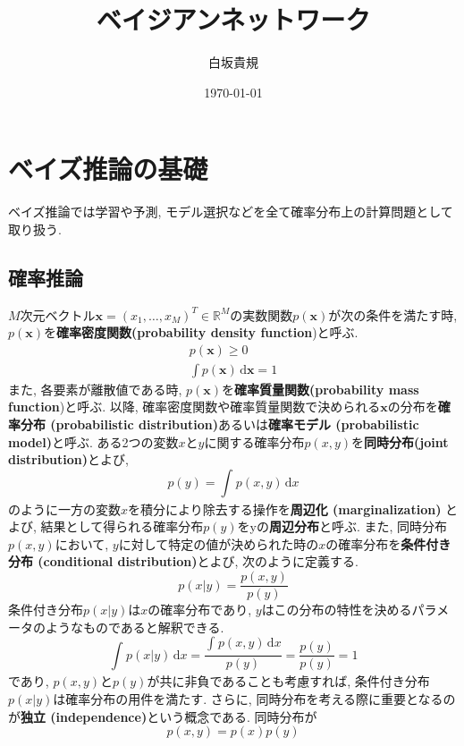 \documentclass[twocolumn]{jarticle}
\title{ベイジアンネットワーク}
\author{白坂貴規}
\date{\today}
\begin{document}
\maketitle

\section{ベイズ推論の基礎}
ベイズ推論では学習や予測, モデル選択などを全て確率分布上の計算問題として取り扱う.
\subsection{確率推論}
${M}$次元ベクトル${\bm {x} = (x_1, \dots, x_M)^T \in \mathbb{R}^M}$の実数関数${p(\bm {x})}$が次の条件を満たす時, ${p(\bm {x})}$を{\bf 確率密度関数(probability density function})と呼ぶ.
\begin{eqnarray}
  p(\bm {x}) \geq 0 \\
  \int p(\bm {x}) \, \mathrm{d}{\bm {x}} = 1
\end{eqnarray}
また, 各要素が離散値である時, ${p(\bm {x})}$を{\bf 確率質量関数(probability mass function})と呼ぶ. 以降, 確率密度関数や確率質量関数で決められる${\bm {x}}$の分布を{\bf 確率分布 (probabilistic distribution)}あるいは{\bf 確率モデル (probabilistic model)}と呼ぶ.
ある2つの変数${x}$と${y}$に関する確率分布${p(x, y)}$を{\bf 同時分布(joint distribution)}とよび,
\begin{equation}
  p(y) = \int_{}^{} p(x, y) \,\mathrm{d}x
\end{equation}
のように一方の変数${x}$を積分により除去する操作を{\bf 周辺化 (marginalization)} とよび, 結果として得られる確率分布${p(y)}$をyの{\bf 周辺分布}と呼ぶ. また, 同時分布${p(x, y)}$において, ${y}$に対して特定の値が決められた時の${x}$の確率分布を{\bf 条件付き分布 (conditional distribution)}とよび, 次のように定義する.
\begin{equation}
  p(x|y) = \frac{p(x, y)}{p(y)}
\end{equation}
条件付き分布${p(x|y)}$は${x}$の確率分布であり, ${y}$はこの分布の特性を決めるパラメータのようなものであると解釈できる.
\begin{equation}
  \int_{}^{} p(x|y) \,\mathrm{d}x = \frac{\int_{}^{} p(x, y) \,\mathrm{d}x}{p(y)} = \frac{p(y)}{p(y)} = 1
\end{equation}
であり, ${p(x, y)}$と${p(y)}$が共に非負であることも考慮すれば, 条件付き分布${p(x|y)}$は確率分布の用件を満たす.
さらに, 同時分布を考える際に重要となるのが{\bf 独立 (independence)}という概念である. 同時分布が
\begin{equation}
  p(x, y) = p(x)p(y)
\end{equation}
\end{document}
